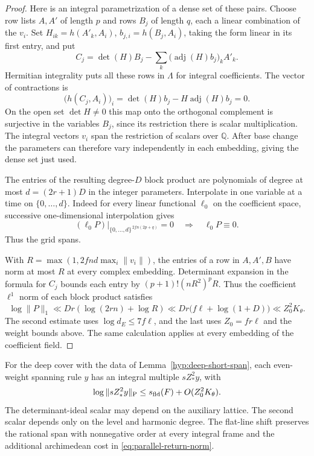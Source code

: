 \begin{proof}
Here is an integral parametrization of a dense set of these pairs. Choose row lists \(A,A'\) of length \(p\) and rows \(B_j\) of length \(q\), each a linear combination of the \(v_i\). Set \(H_{ik}=h(A'_k,A_i)\), \(b_{j,i}=h(B_j,A_i)\), taking the form linear in its first entry, and put
\[
 C_j=\det(H)B_j-\sum_k\bigl(\operatorname{adj}(H)b_j\bigr)_k A'_k .
\]
Hermitian integrality puts all these rows in \(\Lambda\) for integral coefficients. The vector of contractions is
\[
   \big(h(C_j,A_i)\big)_i=\det(H)b_j-H\operatorname{adj}(H)b_j=0 .
\] On the open set \(\det H\ne0\) this map onto the orthogonal complement is surjective in the variables \(B_j\), since its restriction there is scalar multiplication. The integral vectors \(v_i\) span the restriction of scalars over \(\mathbb Q\). After base change the parameters can therefore vary independently in each embedding, giving the dense set just used.

The entries of the resulting degree-\(D\) block product are polynomials of degree at most \(d=(2r+1)D\) in the integer parameters. Interpolate in one variable at a time on \(\{0,\ldots,d\}\). Indeed for every linear functional \(\ell_0\) on the coefficient space, successive one-dimensional interpolation gives
\[
   (\ell_0 P)|_{\{0,\ldots,d\}^{\,2fn(2p+q)}}=0
                  \quad\Longrightarrow\quad \ell_0P\equiv0 .
\]
Thus the grid spans.

With \(R=\max(1,2fn d\max_i\|v_i\|)\), the entries of a row in \(A,A',B\) have norm at most \(R\) at every complex embedding. Determinant expansion in the formula for \(C_j\) bounds each entry by \((p+1)!(nR^2)^p R\). Thus the coefficient \(\ell^1\) norm of each block product satisfies
\[
 \log\|P\|_1
 \ll D r\left(\log(2r n)+\log R\right)
 \ll D r\bigl(f\ell+\log(1+D)\bigr)
 \ll Z_0^2 K_\theta.
\]
The second estimate uses \(\log d_E\le 7f\ell\), and the last uses \(Z_0=fr\ell\) and the weight bounds above. The same calculation applies at every embedding of the coefficient field.
\end{proof}

\begin{proposition}
\label{prop:deep-short-integral-span}
For the deep cover with the data of Lemma~\ref{hyp:deep-short-span},
each even-weight spanning rule \(y\) has an integral
multiple \(sZ_*^2y\), with
\[
     \log\|s Z_*^2 y\|_{\mathrm P}
       \le s_{\rm fld}(F)+O(Z_0^2K_\theta).
\] The determinant-ideal scalar may depend
on the auxiliary lattice. The second scalar depends only on the
level and harmonic degree. The flat-line shift preserves the
rational span with nonnegative order at every integral frame and the
additional archimedean cost in \eqref{eq:parallel-return-norm}.
\end{proposition}

